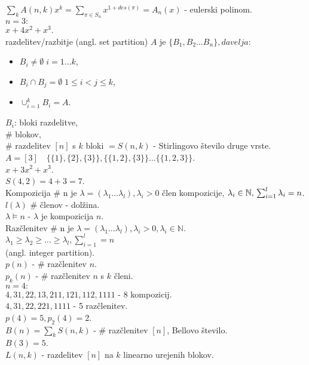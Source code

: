 \documentclass[a4paper, 12pt]{book}
\theoremstyle{definition}
\theoremstyle{remark}
\newcommand{\N}{\mathbb{N}}
\begin{document}
$\sum_k A(n,k) x^k = \sum_{\pi \in S_n} x^{1+des(\pi)} = A_n(x)$ - eulerski polinom. \\
$n=3:$ \\
$x + 4x^2 + x^3$. \\
razdelitev/razbitje (angl. set partition) $A$ je $\{B_1, B_2 \dots B_n\}, da velja:$
\begin{itemize}[label={--}]
  \item $B_i \neq \emptyset \; i = 1 \dots k$,
  \item $B_i \cap B_j = \emptyset \; 1 \leq i < j \leq k$,
  \item $\cup_{i=1}^k B_i = A$.
\end{itemize}
$B_i$: bloki razdelitve, \\
\# blokov, \\
\# razdelitev $[n]$ s $k$ bloki $= S(n,k)$ - Stirlingovo število druge vrste. \\
$A = [3] \quad \{\{1\}, \{2\}, \{3\}\}, \{\{1,2\}, \{3\}\} \dots \{\{1,2,3\}\}$. \\
$x + 3 x^2 + x^3$. \\
$S(4,2) = 4 + 3 = 7$. \\
Kompozicija \# n je $\lambda = (\lambda_1 \dots \lambda_l), \lambda_i > 0$ člen kompozicije,
$\lambda_i \in \N, \\
\sum_{i=1}^{l} \lambda_i = n$. \\
$l(\lambda)$ \# členov - dolžina. \\
$\lambda \models n$ - $\lambda$ je kompozicija $n$. \\
Razčlenitev \# n je $\lambda = (\lambda_1 \dots \lambda_l), \lambda_i > 0, \lambda_i \in \N$. \\
$\lambda_1 \geq \lambda_2 \geq \dots \geq \lambda_l, \sum_{i=1}^{l} = n$ \\
(angl. integer partition). \\
$p(n)$ - \# razčlenitev $n$. \\
$p_k(n)$ - \# razčlenitev $n$ s $k$ členi. \\
$n=4:$ \\
$4, 31, 22, 13, 211, 121, 112, 1111$ - 8 kompozicij. \\
$4, 31, 22, 221, 1111$ - 5 razčlenitev. \\
$p(4) = 5, p_2(4) = 2$. \\
$B(n) = \sum_k S(n,k)$ - \# razčlenitev $[n]$, Bellovo število. \\
$B(3) = 5$. \\
$L(n,k)$ - razdelitev $[n]$ na $k$ linearno urejenih blokov. \\
\end{document}
